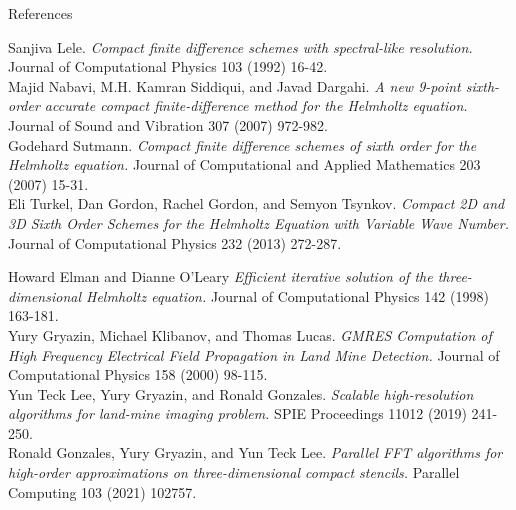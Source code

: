 \documentclass[handout]{beamer}
\begin{document}
\begin{frame}{References}
\begin{thebibliography}{9}
{Sanjiva Lele.}
\textit{Compact finite difference schemes with spectral-like resolution.}
{Journal of Computational Physics 103 (1992) 16-42.}\\

{Majid Nabavi, M.H. Kamran Siddiqui, and Javad Dargahi.}
\textit{A new 9-point sixth-order accurate compact finite-difference method for the Helmholtz equation.}
{Journal of Sound and Vibration 307 (2007) 972-982.}\\

{Godehard Sutmann.}
\textit{Compact finite difference schemes of sixth order for the Helmholtz equation.} 
{Journal of Computational and Applied Mathematics 203 (2007) 15-31.}\\

{Eli Turkel,  Dan Gordon,  Rachel Gordon, and Semyon Tsynkov.}
\textit{Compact 2D and 3D Sixth Order Schemes for the Helmholtz Equation with Variable Wave Number.}
{Journal of Computational Physics 232 (2013) 272-287.}\\
\end{thebibliography}
\end{frame}

\begin{frame}
\begin{thebibliography}{9}


{Howard Elman and Dianne O'Leary}
\textit{Efficient iterative solution of the three-dimensional Helmholtz equation.}
{Journal of Computational Physics 142 (1998) 163-181.}\\


{Yury Gryazin, Michael Klibanov, and Thomas Lucas.}
\textit{GMRES Computation of High Frequency Electrical Field Propagation in Land Mine Detection.}
{Journal of Computational Physics 158 (2000) 98-115.}\\

{Yun Teck Lee,  Yury Gryazin, and Ronald Gonzales.}
\textit{Scalable high-resolution algorithms for land-mine imaging problem.}
{SPIE Proceedings 11012 (2019) 241-250.}\\

{Ronald Gonzales,  Yury Gryazin, and Yun Teck Lee.}
\textit{Parallel FFT algorithms for high-order approximations on three-dimensional compact stencils.}
{Parallel Computing 103 (2021) 102757.}\\

\end{thebibliography}
\end{frame}
\end{document}
